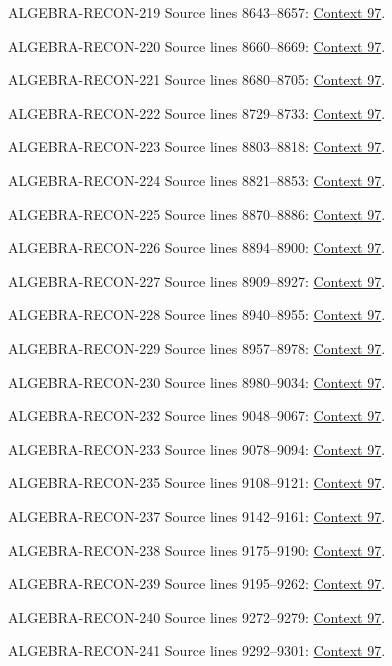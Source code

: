 \begin{AlgebraSourceRoutes}
\item[ALGEBRA-RECON-219] Source lines 8643--8657: \hyperlink{algebra-context-097}{Context 97}.
\item[ALGEBRA-RECON-220] Source lines 8660--8669: \hyperlink{algebra-context-097}{Context 97}.
\item[ALGEBRA-RECON-221] Source lines 8680--8705: \hyperlink{algebra-context-097}{Context 97}.
\item[ALGEBRA-RECON-222] Source lines 8729--8733: \hyperlink{algebra-context-097}{Context 97}.
\item[ALGEBRA-RECON-223] Source lines 8803--8818: \hyperlink{algebra-context-097}{Context 97}.
\item[ALGEBRA-RECON-224] Source lines 8821--8853: \hyperlink{algebra-context-097}{Context 97}.
\item[ALGEBRA-RECON-225] Source lines 8870--8886: \hyperlink{algebra-context-097}{Context 97}.
\item[ALGEBRA-RECON-226] Source lines 8894--8900: \hyperlink{algebra-context-097}{Context 97}.
\item[ALGEBRA-RECON-227] Source lines 8909--8927: \hyperlink{algebra-context-097}{Context 97}.
\item[ALGEBRA-RECON-228] Source lines 8940--8955: \hyperlink{algebra-context-097}{Context 97}.
\item[ALGEBRA-RECON-229] Source lines 8957--8978: \hyperlink{algebra-context-097}{Context 97}.
\item[ALGEBRA-RECON-230] Source lines 8980--9034: \hyperlink{algebra-context-097}{Context 97}.
\item[ALGEBRA-RECON-232] Source lines 9048--9067: \hyperlink{algebra-context-097}{Context 97}.
\item[ALGEBRA-RECON-233] Source lines 9078--9094: \hyperlink{algebra-context-097}{Context 97}.
\item[ALGEBRA-RECON-235] Source lines 9108--9121: \hyperlink{algebra-context-097}{Context 97}.
\item[ALGEBRA-RECON-237] Source lines 9142--9161: \hyperlink{algebra-context-097}{Context 97}.
\item[ALGEBRA-RECON-238] Source lines 9175--9190: \hyperlink{algebra-context-097}{Context 97}.
\item[ALGEBRA-RECON-239] Source lines 9195--9262: \hyperlink{algebra-context-097}{Context 97}.
\item[ALGEBRA-RECON-240] Source lines 9272--9279: \hyperlink{algebra-context-097}{Context 97}.
\item[ALGEBRA-RECON-241] Source lines 9292--9301: \hyperlink{algebra-context-097}{Context 97}.
\end{AlgebraSourceRoutes}

